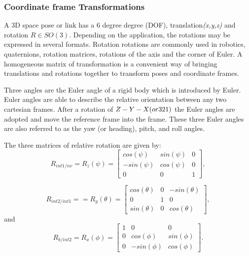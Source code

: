 \subsubsection*{Coordinate frame Transformations}
A 3D space pose or link has a 6 degree degree (DOF), translation\textit{(x,y,z)} and rotation $R \in SO(3)$. Depending on the application, the rotations may be expressed in several formats. Rotation rotations are commonly used in robotics, quaternions, rotation matrices, rotations of the axis and the corner of Euler. A homogeneous matrix of transformation is a convenient way of bringing translations and rotations together to transform poses and coordinate frames\cite{cai_coordinate_2011}.

Three angles are the Euler angle of a rigid body which is introduced by Euler. Euler angles are able to describe the relative orientation between any two cartesian frames. After a rotation of $Z-Y-X (or 3\-2\-1)$ the Euler angles are adopted and move the reference frame into the frame. These three Euler angles are also referred to as the yaw (or heading), pitch, and roll angles\cite{cai_coordinate_2011}.

The three matrices of relative rotation are given by:
\begin{equation}
    R_{int1/nv} = R_{z}(\psi) = \begin{bmatrix}
cos(\psi)  & sin(\psi) & 0\\ 
-sin(\psi) & cos(\psi) & 0 \\ 
0 & 0 & 1
\end{bmatrix},
\end{equation}\label{eq:rz}

\begin{equation}
    R_{int2/int1} = = R_{y}(\theta) =  \begin{bmatrix}
cos(\theta)  & 0 & -sin(\theta)\\ 
0 & 1 & 0 \\ 
sin(\theta) & 0 & cos(\theta)
\end{bmatrix},
\end{equation}\label{eq:ry}
and 
\begin{equation}
    R_{b/int2} = R_{x}(\phi) =\begin{bmatrix}
1  & 0 & 0\\ 
0 & cos(\phi) & sin(\phi) \\ 
0 & -sin(\phi) & cos(\phi)
\end{bmatrix}.
\end{equation}\label{eq:rx}


